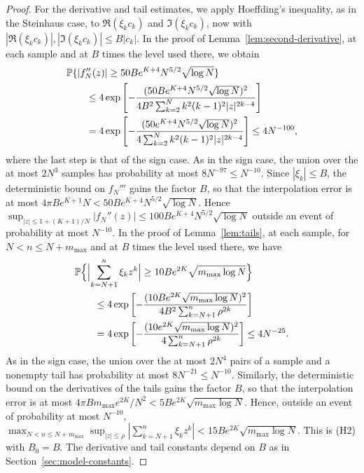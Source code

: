 \begin{proof}
For the derivative and tail estimates, we apply Hoeffding's inequality,
as in the Steinhaus case, to $\Re(\xi_kc_k)$ and $\Im(\xi_kc_k)$, now with
$|\Re(\xi_kc_k)|,|\Im(\xi_kc_k)|\le B|c_k|$.
In the proof of Lemma~\ref{lem:second-derivative}, at each sample and at
$B$ times the level used there, we obtain
\begin{align*}
 &\mathbb P\{|f_N''(z)|\ge50Be^{K+4}N^{5/2}\sqrt{\log N}\}\\
 &\qquad\le4\exp\left[-\frac{(50Be^{K+4}N^{5/2}\sqrt{\log N})^2}
   {4B^2\sum_{k=2}^Nk^2(k-1)^2|z|^{2k-4}}\right]\\
 &\qquad=4\exp\left[-\frac{(50e^{K+4}N^{5/2}\sqrt{\log N})^2}
   {4\sum_{k=2}^Nk^2(k-1)^2|z|^{2k-4}}\right]
 \le4N^{-100},
\end{align*}
where the last step is that of the sign case.
As in the sign case, the union over the at most $2N^3$ samples has probability at
most $8N^{-97}\le N^{-10}$.
Since $|\xi_k|\le B$, the deterministic bound on $f_N'''$ gains the
factor $B$, so that the interpolation error is at most
$4\pi Be^{K+1}N<50Be^{K+4}N^{5/2}\sqrt{\log N}$.
Hence $\sup_{|z|\le1+(K+1)/N}|f_N''(z)|\le100Be^{K+4}N^{5/2}\sqrt{\log N}$
outside an event of probability at most $N^{-10}$.
In the proof of Lemma~\ref{lem:tails}, at each sample, for
$N<n\le N+m_{\max}$ and at $B$ times the level used there, we have
\begin{align*}
 &\mathbb P\Bigl\{\Bigl|\sum_{k=N+1}^n\xi_kz^k\Bigr|
   \ge10Be^{2K}\sqrt{m_{\max}\log N}\Bigr\}\\
 &\qquad\le4\exp\left[-\frac{(10Be^{2K}\sqrt{m_{\max}\log N})^2}
   {4B^2\sum_{k=N+1}^n\rho^{2k}}\right]\\
 &\qquad=4\exp\left[-\frac{(10e^{2K}\sqrt{m_{\max}\log N})^2}
   {4\sum_{k=N+1}^n\rho^{2k}}\right]
 \le4N^{-25}.
\end{align*}
As in the sign case, the union over the at most $2N^4$ pairs of a sample and a
nonempty tail has probability at most $8N^{-21}\le N^{-10}$.
Similarly, the deterministic bound on the derivatives of the tails gains
the factor $B$, so that the interpolation error is at most
$4\pi Bm_{\max}e^{2K}/N^2<5Be^{2K}\sqrt{m_{\max}\log N}$.
Hence, outside an event of probability at most $N^{-10}$,
$\max_{N<n\le N+m_{\max}}\sup_{|z|\le\rho}|\sum_{k=N+1}^n\xi_kz^k|
 <15Be^{2K}\sqrt{m_{\max}\log N}$.
This is (H2) with $B_0=B$.
The derivative and tail constants depend on $B$ as in
Section~\ref{sec:model-constants}.


\end{proof}
